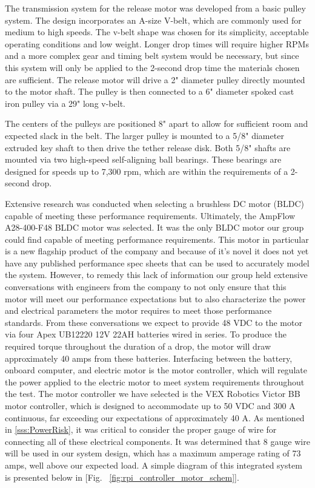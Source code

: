 The transmission system for the release motor was developed from a basic pulley system. The design incorporates an A-size V-belt, which are commonly used for medium to high speeds. The v-belt shape was chosen for its simplicity, acceptable operating conditions and low weight. Longer drop times will require higher RPMs and a more complex gear and timing belt system would be necessary, but since this system will only be applied to the 2-second drop time the materials chosen are sufficient. The release motor will drive a 2" diameter pulley directly mounted to the motor shaft. The pulley is then connected to a 6" diameter spoked cast iron pulley via a 29" long v-belt. 

The centers of the pulleys are positioned 8" apart to allow for sufficient room and expected slack in the belt. The larger pulley is mounted to a 5/8" diameter extruded key shaft to then drive the tether release disk. Both 5/8" shafts are mounted via two high-speed self-aligning ball bearings. These bearings are designed for speeds up to 7,300 rpm, which are within the requirements of a 2-second drop. 

Extensive research was conducted when selecting a brushless DC motor (BLDC) capable of meeting these performance requirements. Ultimately, the AmpFlow A28-400-F48 BLDC motor was selected. It was the only BLDC motor our group could find capable of meeting performance requirements. This motor in particular is a new flagship product of the company and because of it's novel it does not yet have any published performance spec sheets that can be used to accurately model the system. However, to remedy this lack of information our group held extensive conversations with engineers from the company to not only ensure that this motor will meet our performance expectations but to also characterize the power and electrical parameters the motor requires to meet those performance standards. From these conversations we expect to provide 48 VDC to the motor via four Apex UB12220 12V 22AH batteries wired in series. To produce the required torque throughout the duration of a drop, the motor will draw approximately 40 amps from these batteries. Interfacing between the battery, onboard computer, and electric motor is the motor controller, which will regulate the power applied to the electric motor to meet system requirements throughout the test. The motor controller we have selected is the VEX Robotics Victor BB motor controller, which is designed to accommodate up to 50 VDC and 300 A continuous, far exceeding our expectations of approximately 40 A. As mentioned in \ref{sss:PowerRisk}, it was critical to consider the proper gauge of wire for connecting all of these electrical components. It was determined that 8 gauge wire will be used in our system design, which has a maximum amperage rating of 73 amps, well above our expected load. A simple diagram of this integrated system is presented below in [Fig. ~\ref{fig:rpi_controller_motor_schem}].

